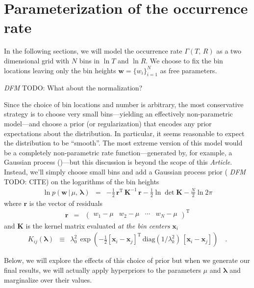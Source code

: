 \documentclass[12pt,preprint]{aastex}
\newcommand{\paper}{\emph{Article}}
\newcommand{\bvec}[1]{\ensuremath{\boldsymbol{#1}}}
\newcommand{\todo}[3]{{\color{#2} \emph{#1} TODO: #3}}
\newcommand{\dfmtodo}[1]{\todo{DFM}{red}{#1}}
\newcommand{\rate}{\ensuremath{\Gamma}}
\newcommand{\radius}{\ensuremath{R}}
\newcommand{\period}{\ensuremath{T}}
\newcommand{\bincenter}{{\ensuremath{\bvec{x}}}}
\newcommand{\binheight}{{\ensuremath{w}}}
\newcommand{\binheights}{{\ensuremath{\bvec{\binheight}}}}
\newcommand{\smooth}{{\ensuremath{\lambda}}}
\begin{document}
\section{Parameterization of the occurrence rate}

In the following sections, we will model the occurrence rate
$\rate(\period,\,\radius)$ as a two dimensional grid with $N$ bins in
$\ln\period$ and $\ln\radius$.
We choose to fix the bin locations leaving only the bin heights
$\binheights = \{\binheight_i\}_{i=1}^{N}$ as free parameters.

\dfmtodo{What about the normalization?}

Since the choice of bin locations and number is arbitrary, the most
conservative strategy is to choose very small bins---yielding an effectively
non-parametric model---and choose a prior (or regularization) that encodes any
prior expectations about the distribution.
In particular, it seems reasonable to expect the distribution to be
``smooth''.
The most extreme version of this model would be a completely non-parametric
rate function---generated by, for example, a Gaussian process
(\citealt{poiss-gp})---but this discussion is beyond the scope of this
\paper.
Instead, we'll simply choose small bins and add a Gaussian process prior
(\dfmtodo{CITE}) on the logarithms of the bin heights
\begin{eqnarray}
\ln p(\binheights\,|\,\mu,\,\bvec{\smooth}) &=&
-\frac{1}{2}\,\bvec{r}^\mathrm{T}\,\bvec{K}^{-1}\,\bvec{r}
-\frac{1}{2}\ln \det \bvec{K} - \frac{N}{2}\ln 2\pi
\end{eqnarray}
where $\bvec{r}$ is the vector of residuals
\begin{eqnarray}
\bvec{r} &=& \left(\begin{array}{cccc}
\binheight_1-\mu & \binheight_2-\mu & \cdots & \binheight_N-\mu
\end{array}\right)^\mathrm{T}
\end{eqnarray}
and $\bvec{K}$ is the kernel matrix evaluated \emph{at the bin centers}
$\bincenter_i$
\begin{eqnarray}
K_{ij}(\bvec{\smooth}) &\equiv& \smooth_0^2\,\exp \left(
-\frac{1}{2}[\bincenter_i-\bincenter_j]^\mathrm{T}\,
\mathrm{diag}(1/\smooth_k^2)\,
[\bincenter_i-\bincenter_j] \right) \quad.
\end{eqnarray}

Below, we will explore the effects of this choice of prior but when we
generate our final results, we will actually apply hyperpriors to the
parameters $\mu$ and $\bvec{\smooth}$ and marginalize over their values.
\end{document}
